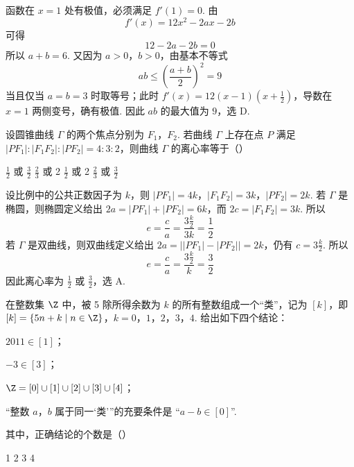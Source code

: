 
\begin{solution}
函数在 \(x=1\) 处有极值，必须满足 \(f'(1)=0\). 由
\[
f'(x)=12x^2-2ax-2b
\]
可得
\[
12-2a-2b=0
\]
所以 \(a+b=6\). 又因为 \(a>0\)，\(b>0\)，由基本不等式
\[
ab\leqslant\left(\frac{a+b}{2}\right)^2=9
\]
当且仅当 \(a=b=3\) 时取等号；此时 \(f'(x)=12(x-1)(x+\frac{1}{2})\)，导数在 \(x=1\) 两侧变号，确有极值. 因此 \(ab\) 的最大值为 \(9\)，选 D.
\end{solution}

\begin{problem}
设圆锥曲线 \(\Gamma\) 的两个焦点分别为 \(F_{1}\)，\(F_{2}\). 若曲线 \(\Gamma\) 上存在点 \(P\) 满足 \(|PF_{1}|: |F_{1}F_{2}|: |PF_{2}| = 4:3:2\)，则曲线 \(\Gamma\) 的离心率等于（\quad）

\choices
    {\(\frac{1}{2}\) 或 \(\frac{3}{2}\)}
    {\(\frac{2}{3}\) 或 2}
    {\(\frac{1}{2}\) 或 2}
    {\(\frac{2}{3}\) 或 \(\frac{3}{2}\)}
\end{problem}


\begin{solution}
设比例中的公共正数因子为 \(k\)，则
\(|PF_1|=4k\)，\(|F_1F_2|=3k\)，\(|PF_2|=2k\).
若 \(\Gamma\) 是椭圆，则椭圆定义给出 \(2a=|PF_1|+|PF_2|=6k\)，而 \(2c=|F_1F_2|=3k\). 所以
\[
e=\frac{c}{a}=\frac{3\frac{k}{2}}{3k}=\frac12
\]
若 \(\Gamma\) 是双曲线，则双曲线定义给出 \(2a=\bigl||PF_1|-|PF_2|\bigr|=2k\)，仍有 \(c=3\frac{k}{2}\). 所以
\[
e=\frac{c}{a}=\frac{3\frac{k}{2}}{k}=\frac32
\]
因此离心率为 \(\frac12\) 或 \(\frac32\)，选 A.
\end{solution}

\begin{problem}
在整数集 \(\Z\) 中，被 5 除所得余数为 \(k\) 的所有整数组成一个“类”，记为 \([k]\)，即 \([k] = \{5n + k \mid n \in \Z\}\)，\(k = 0\)，\(1\)，\(2\)，\(3\)，\(4\). 给出如下四个结论：

\begin{circlelist}
\item \(2011 \in [1]\)；
\item \(-3 \in [3]\)；
\item \(\Z = [0] \cup [1] \cup [2] \cup [3] \cup [4]\)；
\item “整数 \(a\)，\(b\) 属于同一‘类’”的充要条件是 “\(a - b \in [0]\)”.
\end{circlelist}

其中，正确结论的个数是（\quad）

\choices
    {1}
    {2}
    {3}
    {4}
\end{problem}

